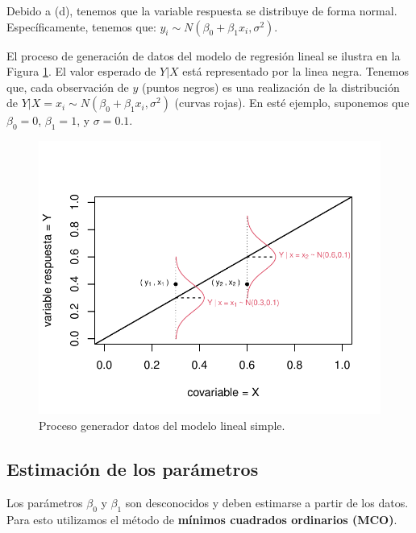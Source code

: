 \documentclass[
]{article}
\begin{document}
Debido a (d), tenemos que la variable respuesta se distribuye de forma normal. Específicamente, tenemos que: \(y_{i} \sim N(\beta_{0} + \beta_{1}x_i, \sigma^{2})\).

El proceso de generación de datos del modelo de regresión lineal se ilustra en la Figura \ref{fig:gendataFigure}. El valor esperado de \(Y|X\) está representado por la linea negra. Tenemos que, cada observación de \(y\) (puntos negros) es una realización de la distribución de \(Y|X=x_{i} \sim N(\beta_{0}+\beta_{1}x_{i},\sigma^{2})\) (curvas rojas). En esté ejemplo, suponemos que \(\beta_{0}=0\), \(\beta_{1}=1\), y \(\sigma=0.1\).

\begin{figure}

{\centering \includegraphics{MLG1_files/figure-latex/gendataFigure-1} 

}

\caption{Proceso generador datos del modelo lineal simple.}\label{fig:gendataFigure}
\end{figure}

\hypertarget{estimaciuxf3n-de-los-paruxe1metros}{%
\subsection{Estimación de los parámetros}\label{estimaciuxf3n-de-los-paruxe1metros}}

Los parámetros \(\beta_{0}\) y \(\beta_{1}\) son desconocidos y deben estimarse a partir de los datos. Para esto utilizamos el método de \textbf{mínimos cuadrados ordinarios (MCO)}.
\end{document}
